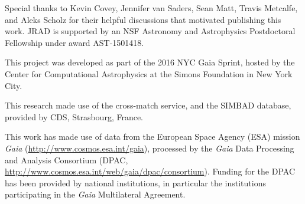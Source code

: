\documentclass[manuscript, letterpaper]{aastex6}
\begin{document}
\acknowledgments
Special thanks to Kevin Covey, Jennifer van Saders, Sean Matt, Travis Metcalfe, and Aleks Scholz for their helpful discussions that motivated publishing this work. JRAD is supported by an NSF Astronomy and Astrophysics Postdoctoral Fellowship under award AST-1501418. 

This project was developed as part of the 2016 NYC Gaia Sprint, hosted by the Center for Computational Astrophysics at the Simons Foundation in New York City.

This research made use of the cross-match service, and the SIMBAD database, provided by CDS, Strasbourg, France.

This work has made use of data from the European Space Agency (ESA)
mission {\it Gaia} (\url{http://www.cosmos.esa.int/gaia}), processed by
the {\it Gaia} Data Processing and Analysis Consortium (DPAC,
\url{http://www.cosmos.esa.int/web/gaia/dpac/consortium}). Funding
for the DPAC has been provided by national institutions, in particular
the institutions participating in the {\it Gaia} Multilateral Agreement.
\end{document}
